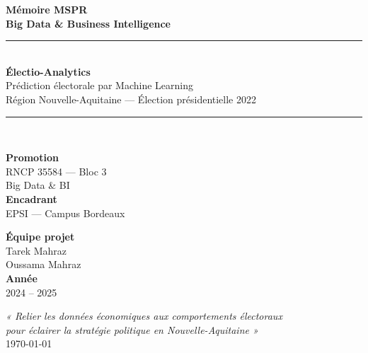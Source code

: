 \documentclass[12pt,a4paper,oneside]{report}
\begin{document}

\begin{titlepage}
  \centering
  \vspace*{1cm}
  {\Huge\bfseries\color{epsiblue} Mémoire MSPR\\[0.3cm]
   Big Data \& Business Intelligence}\\[0.5cm]
  \rule{\linewidth}{2pt}\\[0.4cm]
  {\LARGE\bfseries Électio-Analytics}\\[0.2cm]
  {\large Prédiction électorale par Machine Learning\\
   Région Nouvelle-Aquitaine --- Élection présidentielle 2022}\\[0.2cm]
  \rule{\linewidth}{2pt}\\[1.5cm]
  \begin{minipage}{0.48\textwidth}
    \begin{flushleft}
      {\large\bfseries Promotion}\\RNCP 35584 --- Bloc 3\\Big Data \& BI\\[0.4cm]
      {\large\bfseries Encadrant}\\EPSI --- Campus Bordeaux
    \end{flushleft}
  \end{minipage}
  \hfill
  \begin{minipage}{0.48\textwidth}
    \begin{flushright}
      {\large\bfseries Équipe projet}\\Tarek Mahraz\\Oussama Mahraz\\[0.4cm]
      {\large\bfseries Année}\\2024 -- 2025
    \end{flushright}
  \end{minipage}
  \vfill
  {\large\color{darkgray}\textit{%
    « Relier les données économiques aux comportements électoraux\\
    pour éclairer la stratégie politique en Nouvelle-Aquitaine »}}\\[1cm]
  \today
\end{titlepage}



\tableofcontents
\clearpage











\appendix




\end{document}
